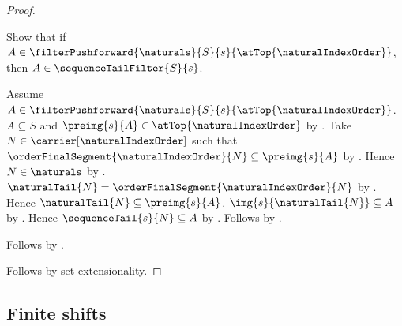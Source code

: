 \begin{proof}
\begin{subproof}
        Show that if $A\in\filterPushforward{\naturals}{S}{s}
            {\atTop{\naturalIndexOrder}}$, then
            $A\in\sequenceTailFilter{S}{s}$.
        \begin{subproof}
            Assume $A\in\filterPushforward{\naturals}{S}{s}
                {\atTop{\naturalIndexOrder}}$.
            $A\subseteq S$ and
                $\preimg{s}{A}\in\atTop{\naturalIndexOrder}$ by
                .
            Take $N\in\carrier[\naturalIndexOrder]$ such that
                $\orderFinalSegment{\naturalIndexOrder}{N}
                    \subseteq\preimg{s}{A}$ by
                .
            Hence $N\in\naturals$ by
                .
            $\naturalTail{N}
                =\orderFinalSegment{\naturalIndexOrder}{N}$ by
                .
            Hence $\naturalTail{N}\subseteq\preimg{s}{A}$.
            $\img{s}{\naturalTail{N}}\subseteq A$ by
                .
            Hence $\sequenceTail{s}{N}\subseteq A$ by
                .
            Follows by .
        \end{subproof}
        Follows by \auto.
    \end{subproof}
    Follows by set extensionality.
\end{proof}

\subsection{Finite shifts}


